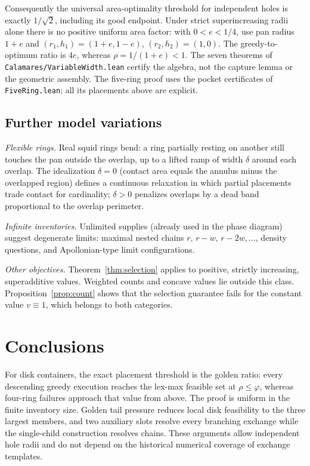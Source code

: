 \documentclass[11pt]{article}
\theoremstyle{definition}
\begin{document}
Consequently the universal area-optimality threshold for independent
holes is exactly $1/\sqrt2$, including its good endpoint. Under strict
superincreasing radii alone there is no positive uniform area factor: with
$0<e<1/4$, use pan radius $1+e$ and
$(r_1,h_1)=(1+e,1-e)$, $(r_2,h_2)=(1,0)$. The greedy-to-optimum
ratio is $4e$, whereas $\rho=1/(1+e)<1$. The seven theorems of
\texttt{Calamares/VariableWidth.lean} certify the algebra, not the
capture lemma or the geometric assembly. The five-ring proof uses the
pocket certificates of \texttt{FiveRing.lean}; all its placements above
are explicit.


\subsection{Further model variations}
\emph{Flexible rings.} Real squid rings bend: a ring partially resting on
another still touches the pan outside the overlap, up to a lifted ramp of
width $\delta$ around each overlap. The idealization $\delta=0$ (contact area
equals the annulus minus the overlapped region) defines a continuous
relaxation in which partial placements trade contact for cardinality; $\delta>0$
penalizes overlaps by a dead band proportional to the overlap perimeter.

\emph{Infinite inventories.} Unlimited supplies (already used in the
phase diagram) suggest degenerate limits: maximal nested chains
$r,\,r-w,\,r-2w,\dots$, density questions, and Apollonian-type limit
configurations.

\emph{Other objectives.} Theorem~\ref{thm:selection} applies to positive,
strictly increasing, superadditive values. Weighted counts and concave
values lie outside this class. Proposition~\ref{prop:count} shows that
the selection guarantee fails for the constant value $v\equiv1$,
which belongs to both categories.

\section{Conclusions}\label{sec:conclusions}

For disk containers, the exact placement threshold is the golden ratio:
every descending greedy execution reaches the lex-max feasible set at
$\rho\le\varphi$, whereas four-ring failures approach that value from
above. The proof is uniform in the finite inventory size. Golden tail
pressure reduces local disk feasibility to the three largest members,
and two auxiliary slots resolve every branching exchange while the
single-child construction resolves chains. These arguments allow
independent hole radii and do not depend on the historical numerical
coverage of exchange templates.
\end{document}
